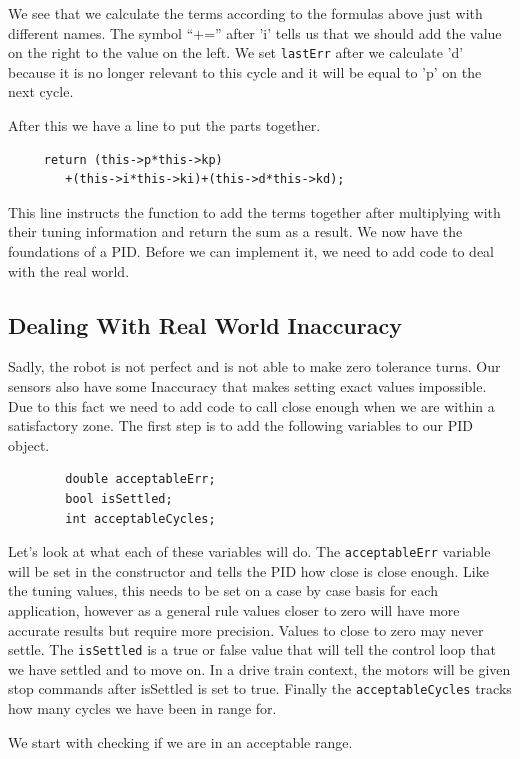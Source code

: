 \documentclass[12pt]{article}
\begin{document}
    We see that we calculate the terms according to the formulas above just with different names. The symbol ``+='' after 'i' tells us that we should add the value on the right to the value on the left. We set \verb|lastErr| after we calculate 'd' because it is no longer relevant to this cycle and it will be equal to 'p' on the next cycle.

    After this we have a line to put the parts together.
    \begin{verbatim}
     return (this->p*this->kp)
        +(this->i*this->ki)+(this->d*this->kd);
    \end{verbatim}

    This line instructs the function to add the terms together after multiplying with their tuning information and return the sum as a result. We now have the foundations of a PID. Before we can implement it, we need to add code to deal with the real world.

\subsection{Dealing With Real World Inaccuracy}
    Sadly, the robot is not perfect and is not able to make zero tolerance turns. Our sensors also have some Inaccuracy that makes setting exact values impossible. Due to this fact we need to add code to call close enough when we are within a satisfactory zone. The first step is to add the following variables to our PID object.

    \begin{verbatim}
        double acceptableErr;
        bool isSettled;
        int acceptableCycles;
    \end{verbatim}

    Let's look at what each of these variables will do. The \verb|acceptableErr| variable will be set in the constructor and tells the PID how close is close enough. Like the tuning values, this needs to be set on a case by case basis for each application, however as a general rule values closer to zero will have more accurate results but require more precision. Values to close to zero may never settle. The \verb|isSettled| is a true or false value that will tell the control loop that we have settled and to move on. In a drive train context, the motors will be given stop commands after isSettled is set to true. Finally the \verb|acceptableCycles| tracks how many cycles we have been in range for.

    We start with checking if we are in an acceptable range.
\end{document}

